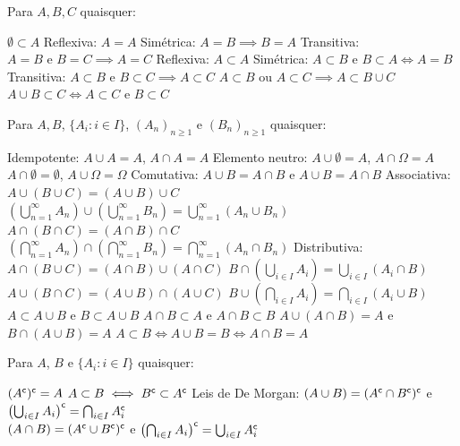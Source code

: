 \pagebreak

\begin{theorem} Para $A,B,C$ quaisquer:
	\begin{outline}[enumerate]
		\1 \( \emptyset \subset A \)
		\1 Reflexiva: \(A = A\)
		\1 Simétrica: \(A = B \implies B = A\)
		\1 Transitiva: \(A = B \text{ e } B = C \implies A=C \) 
		\1 Reflexiva: \(A \subset A\)
		\1 Simétrica: \(A \subset B \text{ e } B \subset A \iff A = B \) 
		\1 Transitiva: \(A \subset B \text{ e } B \subset C \implies A \subset C \)
		\1 \(A \subset B \text{ ou } A \subset C \implies A \subset B\cup C \)
		\1 \(A\cup B \subset C \iff A \subset C \text{ e } B \subset C\)
	\end{outline}
\end{theorem}

\begin{theorem} Para $A,B$, $\{A_i: i \in I\}$, $(A_n)_{n\geq1}$ e $(B_n)_{n\geq1}$ quaisquer:
	\begin{outline}[enumerate]
		\1 Idempotente: \( A\cup A = A \), \( A\cap A = A \)
		\1 Elemento neutro: \( A \cup \emptyset = A\), \(A\cap\Omega=A\)
		\1 \( A \cap \emptyset = \emptyset\), \(A\cup\Omega=\Omega\)  
		\1 Comutativa: \(A\cup B = A\cap B\) e \(A\cup B = A\cap B\)
		\1 Associativa: 
			\2 \( A\cup (B\cup C) = (A \cup B)\cup C \)
			\2 \( \left(\bigcup_{n=1}^\infty A_n\right) \cup  \left(\bigcup_{n=1}^\infty B_n\right) = \bigcup_{n=1}^\infty (A_n\cup B_n) \)
			\2 \( A\cap (B\cap C) = (A \cap B)\cap C \)
			\2 \( \left(\bigcap_{n=1}^\infty A_n\right) \cap  \left(\bigcap_{n=1}^\infty B_n\right) = \bigcap_{n=1}^\infty (A_n\cap B_n) \)
		\1 Distributiva:
			\2 \(A\cap(B\cup C) = (A\cap B)\cup(A\cap C) \)
			\2 \(B\cap\left(\bigcup_{i\in I}A_i\right) = \bigcup_{i\in I}(A_i\cap B) \)
			\2 \(A\cup(B\cap C) = (A\cup B)\cap(A\cup C) \)
			\2 \(B\cup\left(\bigcap_{i\in I}A_i\right) = \bigcap_{i\in I}(A_i\cup B) \)
		\1 \(A \subset A\cup B \) e \(B \subset A\cup B \)
		\1 \(A \cap B \subset A \) e \(A \cap B \subset B\)
		\1 \(A\cup(A\cap B) = A\) e \(B\cap(A\cup B) = A\)
		\1 \(A \subset B \iff A\cup B = B \iff A\cap B = A\)
	\end{outline}
\end{theorem}

\begin{theorem}
	Para $A$, $B$ e $\{A_i: i \in I\}$ quaisquer:	
	\begin{outline}[enumerate]
		\1 \( (A^\mathsf{c})^\mathsf{c} = A \)
		\1 \( A\subset B \iff B^\mathsf{c} \subset A^\mathsf{c} \)
		\1 Leis de De Morgan:
			\2 \( (A\cup B) = (A^\mathsf{c}\cap B^\mathsf{c})^\mathsf{c} \) e \( \left( \bigcup_{i\in I}A_i \right)^\mathsf{c} = \bigcap_{i\in I}A_i^\mathsf{c} \)\\
			\2 \( (A\cap B) = (A^\mathsf{c}\cup B^\mathsf{c})^\mathsf{c} \) e \( \left( \bigcap_{i\in I}A_i \right)^\mathsf{c} = \bigcup_{i\in I}A_i^\mathsf{c} \)
	\end{outline}
\end{theorem}

